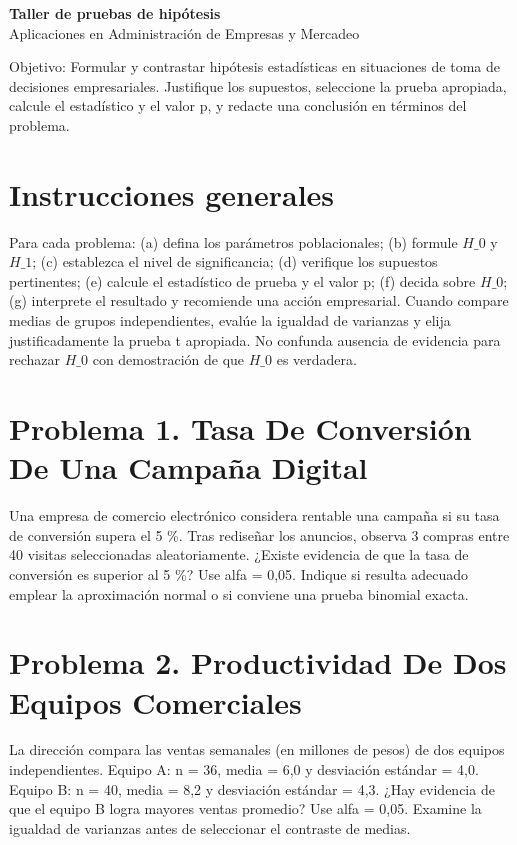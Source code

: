 \documentclass[11pt,letterpaper]{article}
\begin{document}
\begin{center}
{\Large\bfseries Taller de pruebas de hipótesis}\\[3pt]
{\large Aplicaciones en Administración de Empresas y Mercadeo}
\end{center}


Objetivo: Formular y contrastar hipótesis estadísticas en situaciones de toma de decisiones empresariales. Justifique los supuestos, seleccione la prueba apropiada, calcule el estadístico y el valor p, y redacte una conclusión en términos del problema.

\section*{Instrucciones generales}
Para cada problema: (a) defina los parámetros poblacionales; (b) formule \(H\_0\) y \(H\_1\); (c) establezca el nivel de significancia; (d) verifique los supuestos pertinentes; (e) calcule el estadístico de prueba y el valor p; (f) decida sobre \(H\_0\); (g) interprete el resultado y recomiende una acción empresarial. Cuando compare medias de grupos independientes, evalúe la igualdad de varianzas y elija justificadamente la prueba t apropiada. No confunda ausencia de evidencia para rechazar \(H\_0\) con demostración de que \(H\_0\) es verdadera.

\section*{Problema 1. Tasa De Conversión De Una Campaña Digital}
Una empresa de comercio electrónico considera rentable una campaña si su tasa de conversión supera el 5 \%. Tras rediseñar los anuncios, observa 3 compras entre 40 visitas seleccionadas aleatoriamente. ¿Existe evidencia de que la tasa de conversión es superior al 5 \%? Use alfa = 0,05. Indique si resulta adecuado emplear la aproximación normal o si conviene una prueba binomial exacta.

\section*{Problema 2. Productividad De Dos Equipos Comerciales}
La dirección compara las ventas semanales (en millones de pesos) de dos equipos independientes. Equipo A: n = 36, media = 6,0 y desviación estándar = 4,0. Equipo B: n = 40, media = 8,2 y desviación estándar = 4,3. ¿Hay evidencia de que el equipo B logra mayores ventas promedio? Use alfa = 0,05. Examine la igualdad de varianzas antes de seleccionar el contraste de medias.
\end{document}

